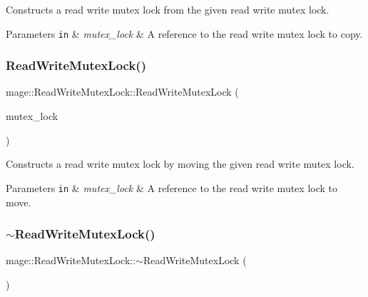 Constructs a read write mutex lock from the given read write mutex lock.


\begin{DoxyParams}[1]{Parameters}
\mbox{\tt in}  & {\em mutex\+\_\+lock} & A reference to the read write mutex lock to copy. \\
\hline
\end{DoxyParams}
\hypertarget{structmage_1_1_read_write_mutex_lock_a5d3ca97393acd046c49b0d3550894007}{}\label{structmage_1_1_read_write_mutex_lock_a5d3ca97393acd046c49b0d3550894007} 
\subsubsection{\texorpdfstring{Read\+Write\+Mutex\+Lock()}{ReadWriteMutexLock()}\hspace{0.1cm}{\footnotesize\ttfamily [3/3]}}
{\footnotesize\ttfamily mage\+::\+Read\+Write\+Mutex\+Lock\+::\+Read\+Write\+Mutex\+Lock (\begin{DoxyParamCaption}\item[{\hyperlink{structmage_1_1_read_write_mutex_lock}{Read\+Write\+Mutex\+Lock} \&\&}]{mutex\+\_\+lock }\end{DoxyParamCaption})\hspace{0.3cm}{\ttfamily [default]}}

Constructs a read write mutex lock by moving the given read write mutex lock.


\begin{DoxyParams}[1]{Parameters}
\mbox{\tt in}  & {\em mutex\+\_\+lock} & A reference to the read write mutex lock to move. \\
\hline
\end{DoxyParams}
\hypertarget{structmage_1_1_read_write_mutex_lock_a64b600234d29ba7307fcd77a17486582}{}\label{structmage_1_1_read_write_mutex_lock_a64b600234d29ba7307fcd77a17486582} 
\subsubsection{\texorpdfstring{$\sim$\+Read\+Write\+Mutex\+Lock()}{~ReadWriteMutexLock()}}
{\footnotesize\ttfamily mage\+::\+Read\+Write\+Mutex\+Lock\+::$\sim$\+Read\+Write\+Mutex\+Lock (\begin{DoxyParamCaption}{ }\end{DoxyParamCaption})}


